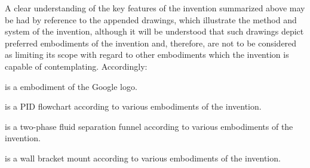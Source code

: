 
\npar A clear understanding of the key features of the invention summarized above may be had 
by reference to the appended drawings, which illustrate the method and system of the 
invention, although it will be understood that such drawings depict preferred 
embodiments of the invention and, therefore, are not to be considered as limiting its 
scope with regard to other embodiments which the invention is capable of contemplating. 
Accordingly:

\npar {} is a embodiment of the Google logo.

\npar {} is a PID flowchart according to various embodiments of the invention.


\npar {} is a two-phase fluid separation funnel according to various embodiments of the invention.

\npar {} is a wall bracket mount according to various embodiments of the invention.

